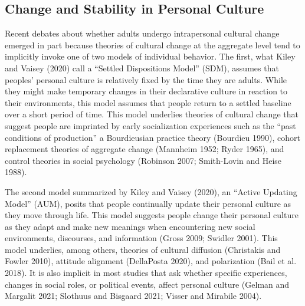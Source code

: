 \documentclass[
  12pt,
]{article}
\begin{document}
\hypertarget{change-and-stability-in-personal-culture}{%
\subsection{Change and Stability in Personal
Culture}\label{change-and-stability-in-personal-culture}}

Recent debates about whether adults undergo intrapersonal cultural
change emerged in part because theories of cultural change at the
aggregate level tend to implicitly invoke one of two models of
individual behavior. The first, what Kiley and Vaisey (2020) call a
``Settled Dispositions Model'' (SDM), assumes that peoples' personal
culture is relatively fixed by the time they are adults. While they
might make temporary changes in their declarative culture in reaction to
their environments, this model assumes that people return to a settled
baseline over a short period of time. This model underlies theories of
cultural change that suggest people are imprinted by early socialization
experiences such as the ``past conditions of production'' a Bourdieusian
practice theory (Bourdieu 1990), cohort replacement theories of
aggregate change (Mannheim 1952; Ryder 1965), and control theories in
social psychology (Robinson 2007; Smith-Lovin and Heise 1988).

The second model summarized by Kiley and Vaisey (2020), an ``Active
Updating Model'' (AUM), posits that people continually update their
personal culture as they move through life. This model suggests people
change their personal culture as they adapt and make new meanings when
encountering new social environments, discourses, and information (Gross
2009; Swidler 2001). This model underlies, among others, theories of
cultural diffusion (Christakis and Fowler 2010), attitude alignment
(DellaPosta 2020), and polarization (Bail et al. 2018). It is also
implicit in most studies that ask whether specific experiences, changes
in social roles, or political events, affect personal culture (Gelman
and Margalit 2021; Slothuus and Bisgaard 2021; Visser and Mirabile
2004).
\end{document}
